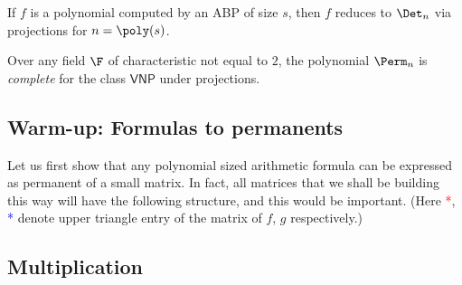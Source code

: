 \begin{theorem}[\cite{v79}]\label{thm:vp}
If $f$ is a polynomial computed by an ABP of size $s$, then $f$ reduces to $\Det_n$ via projections for $n = \poly(s)$. 
\end{theorem}
\begin{theorem}[\cite{v79}]\label{thm:vnp}
Over any field $\F$ of characteristic not equal to $2$, the polynomial $\Perm_n$ is \emph{complete} for the class $\mathsf{VNP}$ under projections.
\end{theorem}

\subsection{Warm-up: Formulas to permanents}\label{sec:formula-to-dets}

Let us first show that any polynomial sized arithmetic formula can be expressed as permanent of a small matrix.
In fact, all matrices that we shall be building this way will have the following structure, and this would be
important. (Here \textcolor{red}{*}, \textcolor{blue}{*} denote upper triangle entry of the matrix of $f$, $g$ respectively.)

\begin{center}
\end{center}

\subsection*{Multiplication}

